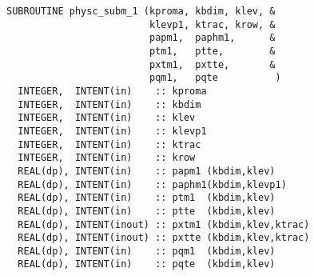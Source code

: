 \begin{lstlisting}[caption=physc\_subm\_1]
SUBROUTINE physc_subm_1 (kproma, kbdim, klev, &
                         klevp1, ktrac, krow, &
                         papm1,  paphm1,      &
                         ptm1,   ptte,        &
                         pxtm1,  pxtte,       &  
                         pqm1,   pqte          ) 
  INTEGER,  INTENT(in)    :: kproma 
  INTEGER,  INTENT(in)    :: kbdim
  INTEGER,  INTENT(in)    :: klev 
  INTEGER,  INTENT(in)    :: klevp1
  INTEGER,  INTENT(in)    :: ktrac 
  INTEGER,  INTENT(in)    :: krow  
  REAL(dp), INTENT(in)    :: papm1 (kbdim,klev)
  REAL(dp), INTENT(in)    :: paphm1(kbdim,klevp1)
  REAL(dp), INTENT(in)    :: ptm1  (kbdim,klev)
  REAL(dp), INTENT(in)    :: ptte  (kbdim,klev)
  REAL(dp), INTENT(inout) :: pxtm1 (kbdim,klev,ktrac)
  REAL(dp), INTENT(inout) :: pxtte (kbdim,klev,ktrac)
  REAL(dp), INTENT(in)    :: pqm1  (kbdim,klev)
  REAL(dp), INTENT(in)    :: pqte  (kbdim,klev)
\end{lstlisting}

